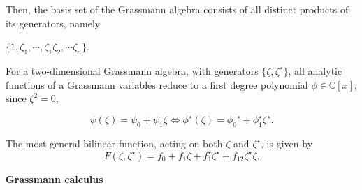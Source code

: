 Then, the basis set of the Grassmann algebra consists of all distinct products of its generators, namely 

$\{1, \zeta_1, \cdots, \zeta_1 \zeta_2, \cdots \zeta_n\}$. 

For a two-dimensional Grassmann algebra, with generators $\{\zeta, {\zeta}^\star\}$, all analytic functions of a Grassmann variables reduce to a first degree polynomial $\phi \in \mathds{C}[x]$, since ${\zeta}^2 = 0$,

$$
    \psi(\zeta) = \psi_0 + \psi_1 \zeta \Leftrightarrow {\phi}^\star(\zeta) = {\phi_0}^\star + {\phi}^\star_1 {\zeta}^\star.
$$

The most general bilinear function, acting on both ${\zeta}$ and ${\zeta}^\star$, is given by 
$$
    F(\zeta, {\zeta}^\star) = f_0 + f_1 \zeta + {f}_1^\star {\zeta}^\star + f_{12} {\zeta}^\star \zeta.
$$

\textbf{\underline{Grassmann calculus}}


